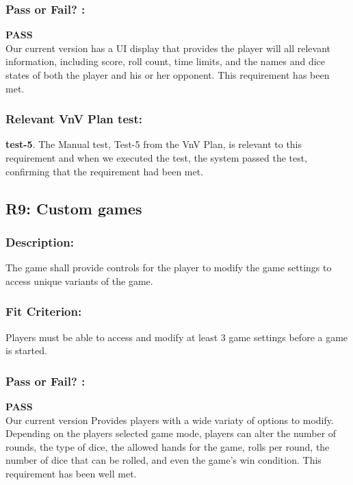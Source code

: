 \documentclass[12pt, titlepage]{article}
\begin{document}
\subsubsection*{Pass or Fail? :} 

 \noindent \textbf{PASS}\\
 
 Our current version has a UI display that provides the player will all relevant information, including score, roll count, time limits, and the names and dice states of both the player and his or her opponent. This requirement has been met.

\subsubsection*{Relevant VnV Plan test: } \textbf{test-5}.  The Manual test, Test-5 from the VnV Plan, is relevant to this requirement and when we executed the test, the system passed the test, confirming that the requirement had been met.

 
\subsection{R9: Custom games} 
\label{R9}

\subsubsection*{Description:}The game shall provide controls for the player to modify the game settings to access unique variants of the game.

\subsubsection*{Fit Criterion:}Players must be able to access and modify at least 3 game settings before a game is started.

\subsubsection*{Pass or Fail? :} 

 \noindent \textbf{PASS}\\
 
  Our current version Provides players with a wide variaty of options to modify. Depending on the players selected game mode, players can alter the number of rounds, the type of dice, the allowed hands for the game, rolls per round, the number of dice that can be rolled, and even the game's win condition. This requirement has been well met.
\end{document}
